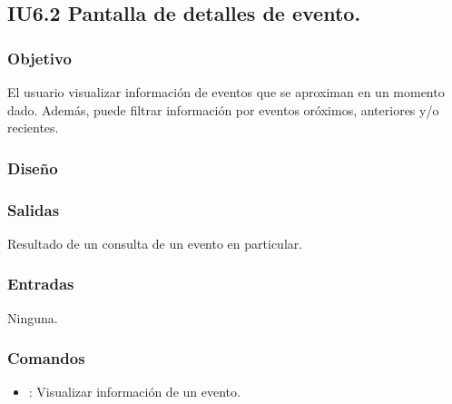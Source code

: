 
\subsection{IU6.2 Pantalla de detalles de evento.}

\subsubsection{Objetivo}
	El usuario visualizar información de eventos que se aproximan en un momento dado. Además, puede filtrar información por eventos oróximos, anteriores y/o recientes.

\subsubsection{Diseño}


\subsubsection{Salidas}

	Resultado de un consulta de un evento en particular.

\subsubsection{Entradas}
	Ninguna.

\subsubsection{Comandos}
\begin{itemize}
	\item {}: Visualizar información de un evento.
\end{itemize}

